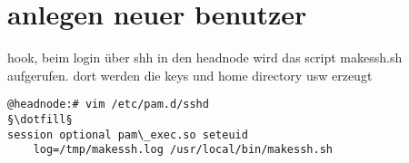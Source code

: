 \section{anlegen neuer benutzer}
hook, beim login über shh in den headnode wird das script makessh.sh aufgerufen.
dort werden die keys und home directory usw erzeugt
\begin{lstlisting}[style=Bash]
@headnode:# vim /etc/pam.d/sshd
§\dotfill§
session optional pam\_exec.so seteuid 
    log=/tmp/makessh.log /usr/local/bin/makessh.sh
\end{lstlisting}

